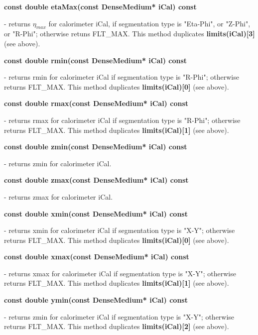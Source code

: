 \begin{center}
   {\bf const double etaMax(const DenseMedium* iCal) const }
\end{center}
   - returns $\eta_{max}$ for calorimeter iCal, if segmentation type is "Eta-Phi",
   or "Z-Phi", or "R-Phi";
   otherwise retuns FLT\_MAX. This method duplicates {\bf limits(iCal)[3]}
   (see above).
   
\begin{center}   
   {\bf const double rmin(const DenseMedium* iCal) const }
\end{center}
   - returns rmin for calorimeter iCal if segmentation type is "R-Phi";
   otherwise returns FLT\_MAX. This method duplicates {\bf limits(iCal)[0]}
   (see above).

\begin{center}
   {\bf const double rmax(const DenseMedium* iCal) const }
\end{center}
   - returns rmax for calorimeter iCal if segmentation type is "R-Phi";
   otherwise returns FLT\_MAX. This method duplicates {\bf limits(iCal)[1]}
   (see above).

\begin{center}
   {\bf const double zmin(const DenseMedium* iCal) const }
\end{center}
   - returns zmin for calorimeter iCal.

\begin{center}
   {\bf const double zmax(const DenseMedium* iCal) const }
\end{center}
   - returns zmax for calorimeter iCal. 

\begin{center}
   {\bf const double xmin(const DenseMedium* iCal) const }
\end{center}
   - returns xmin for calorimeter iCal if segmentation type is "X-Y";
   otherwise returns FLT\_MAX. This method duplicates {\bf limits(iCal)[0]}
   (see above).

\begin{center}
   {\bf const double xmax(const DenseMedium* iCal) const }
\end{center}
   - returns xmax for calorimeter iCal if segmentation type is "X-Y";
   otherwise returns FLT\_MAX. This method duplicates {\bf limits(iCal)[1]}
   (see above).

\newpage
\begin{center}
   {\bf const double ymin(const DenseMedium* iCal) const }
\end{center}
   - returns zmin for calorimeter iCal if segmentation type is "X-Y";
   otherwise returns FLT\_MAX. This method duplicates {\bf limits(iCal)[2]}
   (see above).

